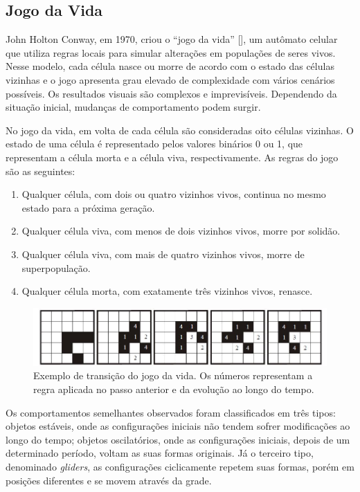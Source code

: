 \documentclass[brazil,ruledheader]{abnt}
\renewcommand{\cite}[1]{[\citeonline{#1}]}
\begin{document}
\subsection{Jogo da Vida}

John Holton Conway, em 1970, criou o ``jogo da vida'' \cite{CaCa08,Be}, um
autômato celular que utiliza regras locais para simular alterações em populações
de seres vivos. Nesse modelo, cada célula nasce ou morre de acordo com o estado
das células vizinhas e o jogo apresenta grau elevado de complexidade com
vários cenários possíveis. Os resultados visuais são complexos e
imprevisíveis. Dependendo da situação inicial, mudanças de comportamento
podem surgir.

No jogo da vida, em volta de cada célula são consideradas oito células
vizinhas. O estado de uma célula é representado pelos valores binários 0 ou 1,
que  representam a célula morta e a célula viva, respectivamente. As regras
do jogo são as seguintes:

\begin{enumerate}
\item Qualquer célula, com dois ou quatro vizinhos vivos, continua no mesmo
estado
para a próxima geração.
\item Qualquer célula viva, com menos de dois vizinhos vivos, morre por solidão.
\item Qualquer célula viva, com mais de quatro vizinhos vivos, morre de
superpopulação.
\item Qualquer célula morta, com exatamente três vizinhos vivos, renasce.
\end{enumerate}

\begin{figure}[!h]
 \centering
\includegraphics[width= 0.9 \linewidth]{Figuras/figura1.jpg}
\caption [Exemplo de transição do jogo da vida]{Exemplo de transição do jogo da
vida. Os números representam a regra
aplicada no passo anterior e da evolução ao longo do tempo.}
\label{fig:JogoDaVida}
\end{figure}

Os comportamentos semelhantes observados foram classificados em três tipos:
objetos estáveis, onde as configurações iniciais não tendem sofrer modificações
ao longo do tempo; objetos oscilatórios, onde as configurações iniciais, depois
de um determinado período, voltam as suas formas originais. Já o terceiro tipo,
denominado \emph{gliders}, as configurações ciclicamente repetem suas formas,
porém em posições diferentes e se movem através da grade. 
\end{document}
